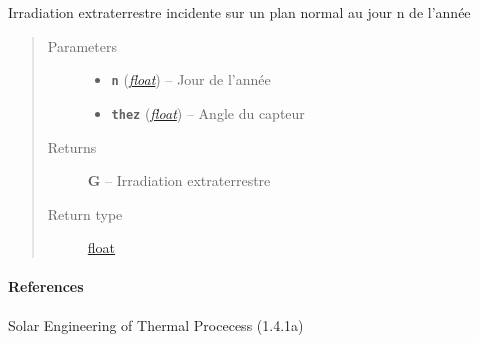 \documentclass[letterpaper,10pt,english]{sphinxmanual}
\begin{document}
\begin{fulllineitems}
\label{python:solar_mod.irradiation_extraterrestre}
Irradiation extraterrestre incidente sur un plan normal au jour n de l'année
\begin{quote}\begin{description}
\item[{Parameters}] \leavevmode\begin{itemize}
\item {} 
\textbf{\texttt{n}} (\href{https://docs.python.org/library/functions.html\#float}{\emph{float}}) -- Jour de l'année

\item {} 
\textbf{\texttt{thez}} (\href{https://docs.python.org/library/functions.html\#float}{\emph{float}}) -- Angle du capteur

\end{itemize}

\item[{Returns}] \leavevmode
\textbf{G} -- Irradiation extraterrestre

\item[{Return type}] \leavevmode
\href{https://docs.python.org/library/functions.html\#float}{float}

\end{description}\end{quote}
\paragraph{References}

Solar Engineering of Thermal Procecess (1.4.1a)

\end{fulllineitems}

\end{document}
